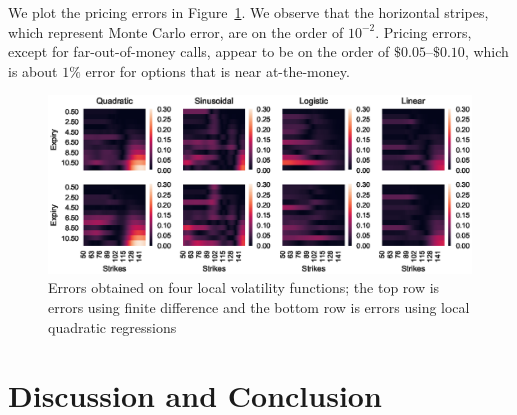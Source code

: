\documentclass[11pt]{article}
\numberwithin{equation}{section}
\begin{document}
We plot the pricing errors in Figure~\ref{fig:errors}. We observe that the horizontal stripes, which represent Monte Carlo error, are on the order of $10^{-2}$. Pricing errors, except for far-out-of-money calls, appear to be on the order of $\$0.05$--$\$0.10$, which is about $1\%$ error for options that is near at-the-money.

\begin{figure}[h!]
  \centering
  \includegraphics{figs/errors.eps}
  \caption{Errors obtained on four local volatility functions; the top row is errors using finite difference and the bottom row is errors using local quadratic regressions}
  \label{fig:errors}
\end{figure}




\section{Discussion and Conclusion}
\label{sec:conc}





\newpage

\appendix
\appendixpage







\end{document}
